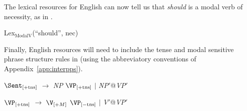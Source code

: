 The lexical resources for English can now tell us that \textit{should}
is a modal verb of necessity, as in \nexteg{}.
\begin{ex} 
Lex$_{\mathrm{ModalV}}$(``should'', nec) 
\end{ex} 
Finally, English resources will need to include the tense and modal
sensitive phrase structure rules in \nexteg{} (using the abbreviatory
conventions of Appendix~\ref{app:interpps}).
\begin{ex} 
\begin{subex} 
 
\item $\displaystyle\Sent_{[+\mathrm{tns}]}$ $\longrightarrow$ \textit{NP}
  $\displaystyle\VP_{[+\mathrm{tns}]}$ $\mid$ \textit{NP}$'$@\textit{VP}$'$ 
 
\item $\displaystyle\VP_{[+\mathrm{tns}]}$ $\longrightarrow$
  $\displaystyle\V_{[+M]}$ $\displaystyle\VP_{[-\mathrm{tns}]}$ $\mid$ \textit{V}$'$@\textit{VP}$'$ 
 
\end{subex} 
   
\end{ex} 

